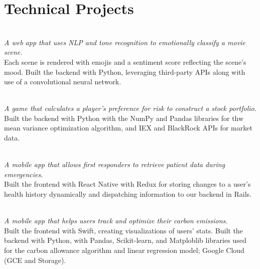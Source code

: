 \documentclass[]{deedy-resume-openfont}
\begin{document}
\begin{minipage}[t]{0.66\textwidth}

\section{Technical Projects}
\href{https://devpost.com/software/emoci}{}\\
\textit{A web app that uses NLP and tone recognition to emotionally classify a movie scene.} \\ Each scene is rendered with emojis and a sentiment score reflecting the scene's mood. Built the backend with Python, leveraging third-party APIs along with use of a convolutional neural network.
\sectionsep 

\href{https://devpost.com/software/growthdriver}{}\\
\textit{A game that calculates a player's preference for risk to construct a stock portfolio.} \\ Built the backend with Python with the NumPy and Pandas libraries for thw mean variance optimization algorithm, and IEX and BlackRock APIs for market data.
\sectionsep 

\href{https://devpost.com/software/medvault}{}\\
\textit{A mobile app that allows first responders to  retrieve patient data during emergencies.} \\ Built the frontend with React Native with Redux for storing changes to a user's health history dynamically and dispatching information to our backend in Rails.
\sectionsep

\href{https://devpost.com/software/my6footprint}{}\\
\textit{A mobile app that helps users track and optimize their carbon emissions.}\\ Built the frontend with Swift, creating visualizations of users' stats. Built the backend with Python, with Pandas, Scikit-learn, and Matploblib libraries used for the carbon allowance algorithm and linear regression model; Google Cloud (GCE and Storage).
\sectionsep 


% 
% 

\end{minipage} 
\end{document}
